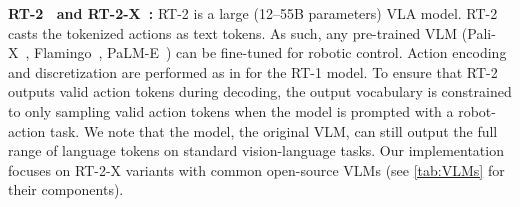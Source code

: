 \documentclass[11pt,letterpaper]{article}
\begin{document}
\noindent\textbf{ RT-2~\cite{rt-2} and RT-2-X~\cite{9}:} RT-2 is a large (12--55B parameters) VLA model.
RT-2 casts the tokenized actions as text tokens.
As such, any pre-trained VLM (\eg Pali-X~\cite{chen2023palix}, Flamingo~\cite{alayrac2022flamingo}, {P}a{LM}-E~\cite{driess2023palme}) can be fine-tuned for robotic control. %
Action encoding and discretization are performed as in \cite{rt-1} for the RT-1 model. 
To ensure that RT-2 outputs valid action tokens during decoding, the output vocabulary is
constrained to only sampling valid action tokens when the model is prompted with a robot-action task.
We note that the model, \ie the original VLM, can still output the full range of language tokens on standard vision-language tasks.
Our implementation focuses on RT-2-X variants with common open-source VLMs (see \autoref{tab:VLMs} for their components). 
\end{document}

